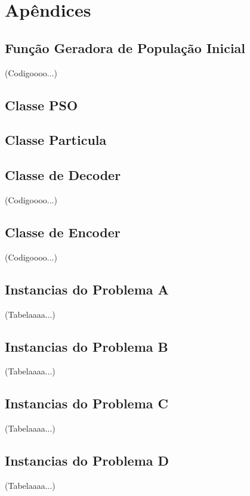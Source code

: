 \chapter{Apêndices}

\appendix

\section{Função Geradora de População Inicial}
\label{apd:fun-gen-init-pop}
    (Codigoooo...)

\section{Classe PSO}
\label{apd:pso-class}

\section{Classe Particula}
\label{apd:particule-class}

\section{Classe de Decoder}
\label{apd:decode-class}
    (Codigoooo...)

\section{Classe de Encoder}
\label{apd:encode-class}
    (Codigoooo...)

\label{apd:problem-instances}

\section{Instancias do Problema A}
\label{apd:problem-instance-a}
    (Tabelaaaa...)
\section{Instancias do Problema B}
\label{apd:problem-instance-b}
    (Tabelaaaa...)
\section{Instancias do Problema C}
\label{apd:problem-instance-c}
    (Tabelaaaa...)
\section{Instancias do Problema D}
\label{apd:problem-instance-d}
    (Tabelaaaa...)


